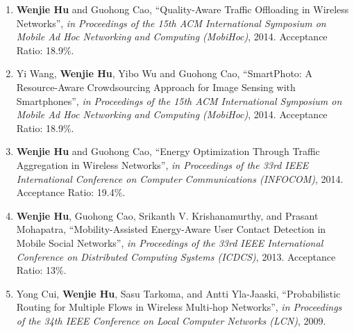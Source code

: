 \documentclass[margin,line]{res}
\begin{document}
\begin{resume}
\begin{enumerate} [leftmargin=5mm]
\item  {\bf Wenjie Hu} and Guohong Cao, ``Quality-Aware Traffic Offloading in Wireless Networks'', {\em in Proceedings of the 15th ACM International Symposium on Mobile Ad Hoc Networking and Computing (MobiHoc)}, 2014. Acceptance Ratio: 18.9\%.%
\item Yi Wang, {\bf Wenjie Hu}, Yibo Wu and Guohong Cao, ``SmartPhoto: A Resource-Aware Crowdsourcing Approach for Image Sensing with Smartphones'', {\em in Proceedings of the 15th ACM International Symposium on Mobile Ad Hoc Networking and Computing (MobiHoc)}, 2014. Acceptance Ratio: 18.9\%.%
\item {\bf Wenjie Hu} and Guohong Cao, ``Energy Optimization Through Traffic Aggregation in Wireless Networks'', {\em in Proceedings of the 33rd IEEE International Conference on Computer Communications (INFOCOM)}, 2014. Acceptance Ratio: 19.4\%.%
\item {\bf Wenjie Hu}, Guohong Cao, Srikanth V. Krishanamurthy, and Prasant Mohapatra, ``Mobility-Assisted Energy-Aware User Contact Detection in Mobile Social Networks'', {\em in Proceedings of the 33rd IEEE International Conference on Distributed Computing Systems (ICDCS)}, 2013. Acceptance Ratio: 13\%.%
\item Yong Cui, {\bf Wenjie Hu}, Sasu Tarkoma, and Antti Yla-Jaaski, ``Probabilistic Routing for Multiple Flows in Wireless Multi-hop Networks'', {\em in Proceedings of the 34th IEEE Conference on Local Computer Networks (LCN)}, 2009. %
\end{enumerate}


\end{resume}
\end{document}
